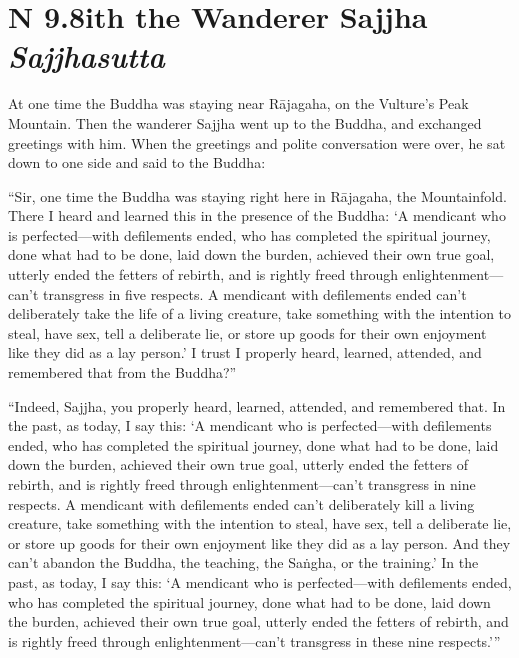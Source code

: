\documentclass[12pt,openany]{book}%
\newcommand*{\suttatitleacronym}[1]{\smaller[2]{#1}\vspace*{.3em}}
\newcommand*{\suttatitletranslation}[1]{\linebreak{#1}}
\newcommand*{\suttatitleroot}[1]{\linebreak\smaller[2]\itshape{#1}}
\newcommand*{\tocacronym}[1]{\hspace*{-3.3em}{#1}\quad}
\newcommand*{\toctranslation}[1]{#1}
\newcommand*{\tocroot}[1]{(\textit{#1})}
\begin{document}
%
\section*{{\suttatitleacronym AN 9.8}{\suttatitletranslation With the Wanderer Sajjha }{\suttatitleroot Sajjhasutta}}
\addcontentsline{toc}{section}{\tocacronym{AN 9.8} \toctranslation{With the Wanderer Sajjha } \tocroot{Sajjhasutta}}

At one time the Buddha was staying near \textsanskrit{Rājagaha}, on the Vulture’s Peak Mountain. Then the wanderer Sajjha went up to the Buddha, and exchanged greetings with him. When the greetings and polite conversation were over, he sat down to one side and said to the Buddha: 

“Sir, one time the Buddha was staying right here in \textsanskrit{Rājagaha}, the Mountainfold. There I heard and learned this in the presence of the Buddha: ‘A mendicant who is perfected—with defilements ended, who has completed the spiritual journey, done what had to be done, laid down the burden, achieved their own true goal, utterly ended the fetters of rebirth, and is rightly freed through enlightenment—can’t transgress in five respects. A mendicant with defilements ended can’t deliberately take the life of a living creature, take something with the intention to steal, have sex, tell a deliberate lie, or store up goods for their own enjoyment like they did as a lay person.’ I trust I properly heard, learned, attended, and remembered that from the Buddha?” 

“Indeed, Sajjha, you properly heard, learned, attended, and remembered that. In the past, as today, I say this: ‘A mendicant who is perfected—with defilements ended, who has completed the spiritual journey, done what had to be done, laid down the burden, achieved their own true goal, utterly ended the fetters of rebirth, and is rightly freed through enlightenment—can’t transgress in nine respects. A mendicant with defilements ended can’t deliberately kill a living creature, take something with the intention to steal, have sex, tell a deliberate lie, or store up goods for their own enjoyment like they did as a lay person. And they can’t abandon the Buddha, the teaching, the \textsanskrit{Saṅgha}, or the training.’ In the past, as today, I say this: ‘A mendicant who is perfected—with defilements ended, who has completed the spiritual journey, done what had to be done, laid down the burden, achieved their own true goal, utterly ended the fetters of rebirth, and is rightly freed through enlightenment—can’t transgress in these nine respects.’” 
\end{document}
